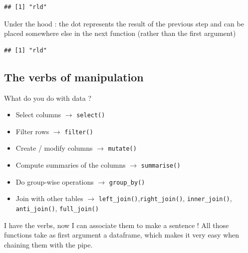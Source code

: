 \documentclass[
]{book}
\newenvironment{Shaded}{\begin{snugshade}}{\end{snugshade}}
\newcommand{\DecValTok}[1]{\textcolor[rgb]{0.00,0.00,0.81}{#1}}
\newcommand{\KeywordTok}[1]{\textcolor[rgb]{0.13,0.29,0.53}{\textbf{#1}}}
\newcommand{\NormalTok}[1]{#1}
\newcommand{\OperatorTok}[1]{\textcolor[rgb]{0.81,0.36,0.00}{\textbf{#1}}}
\newcommand{\StringTok}[1]{\textcolor[rgb]{0.31,0.60,0.02}{#1}}
\providecommand{\tightlist}{%
  \setlength{\itemsep}{0pt}\setlength{\parskip}{0pt}}
\begin{document}
\begin{verbatim}
## [1] "rld"
\end{verbatim}

Under the hood : the dot represents the result of the previous step and can be placed somewhere else in the next function (rather than the first argument)

\begin{Shaded}
\end{Shaded}

\begin{verbatim}
## [1] "rld"
\end{verbatim}

\hypertarget{the-verbs-of-manipulation}{%
\subsection{The verbs of manipulation}\label{the-verbs-of-manipulation}}

What do you do with data ?

\begin{itemize}
\tightlist
\item
  Select columns \(\rightarrow\) \texttt{select()}
\item
  Filter rows \(\rightarrow\) \texttt{filter()}
\item
  Create / modify columns \(\rightarrow\) \texttt{mutate()}
\item
  Compute summaries of the columns \(\rightarrow\) \texttt{summarise()}
\item
  Do group-wise operations \(\rightarrow\) \texttt{group\_by()}
\item
  Join with other tables \(\rightarrow\) \texttt{left\_join()},\texttt{right\_join()}, \texttt{inner\_join()}, \texttt{anti\_join()}, \texttt{full\_join()}
\end{itemize}

I have the verbs, now I can associate them to make a sentence ! All those functions take as first argument a dataframe, which makes it very easy when chaining them with the pipe.
\end{document}
